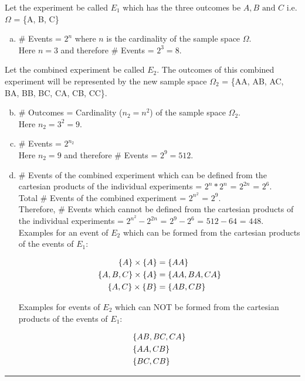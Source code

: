 Let the experiment be called $E_1$ which has the three outcomes be $A, B \text{ and } C$ i.e. $\Omega$ = \{A, B, C\}\\
\begin{enumerate}[a.]
	\item \# Events = $2^n$ where $n$ is the cardinality of the sample space $\Omega$. \\
	Here $n = 3$ and therefore \# Events = $2^3 = 8$.
\end{enumerate}	
	Let the combined experiment be called $E_2$.
	The outcomes of this combined experiment will be represented by the new sample space $\Omega_2$ = \{AA, AB, AC, BA, BB, BC, CA, CB, CC\}.
\begin{enumerate}[a.]\setcounter{enumi}{1}
	\item \# Outcomes = Cardinality ($n_2 = n^2$) of the sample space $\Omega_2$. \\
	Here $n_2 = 3^2 = 9$.
	\item \# Events = $2^{n_2}$ \\
	Here $n_2 = 9$ and therefore \# Events = $2^9 = 512$.
	\item \# Events of the combined experiment which can be defined from the cartesian products of the individual experiments = $2^n * 2^n$ = $2^{2n}$ = $2^6$. \\
	Total \# Events of the combined experiment = $2^{n^2}$ = $2^9$.\\
	Therefore, \# Events which cannot be defined from the cartesian products of the individual experiments = $2^{n^2} - 2^{2n}$ = $2^9 - 2^6$ = $512 - 64$ = $448$.\\[10pt]
	Examples for an event of $E_2$ which can be formed from the cartesian products of the events of $E_1$:
	
	\begin{align*}
		\{A\} \times \{A\} &= \{AA\} \nonumber\\
		\{A, B, C\} \times \{A\} &= \{AA, BA, CA\} \nonumber\\
		\{A, C\} \times \{B\} &= \{AB, CB\} \nonumber
	\end{align*} 

	Examples for events of $E_2$ which can NOT be formed from the cartesian products of the events of $E_1$:

	\begin{align*}
		& \{AB, BC, CA\} \nonumber\\
		& \{AA, CB\} \nonumber\\
		& \{BC, CB\} \nonumber
	\end{align*} 
	\end{enumerate}	

\noindent\rule{\textwidth}{1pt}

